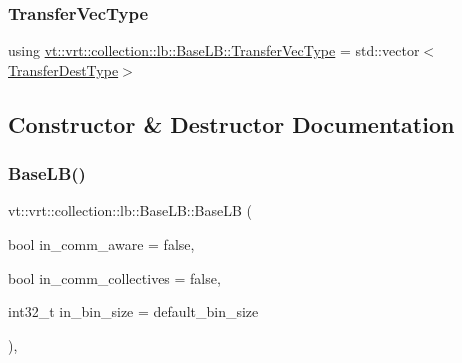 \mbox{\label{structvt_1_1vrt_1_1collection_1_1lb_1_1_base_l_b_a329e8179ec41a1bd4924c79fe23a79af}} 
\subsubsection{\texorpdfstring{Transfer\+Vec\+Type}{TransferVecType}}
{\footnotesize\ttfamily using \hyperlink{structvt_1_1vrt_1_1collection_1_1lb_1_1_base_l_b_a329e8179ec41a1bd4924c79fe23a79af}{vt\+::vrt\+::collection\+::lb\+::\+Base\+L\+B\+::\+Transfer\+Vec\+Type} =  std\+::vector$<$\hyperlink{structvt_1_1vrt_1_1collection_1_1lb_1_1_base_l_b_add886785f64ea725005f1263fd1393be}{Transfer\+Dest\+Type}$>$}



\subsection{Constructor \& Destructor Documentation}
\mbox{\label{structvt_1_1vrt_1_1collection_1_1lb_1_1_base_l_b_addef25b03975034a0936c515a2942d43}} 
\subsubsection{\texorpdfstring{Base\+L\+B()}{BaseLB()}\hspace{0.1cm}{\footnotesize\ttfamily [1/3]}}
{\footnotesize\ttfamily vt\+::vrt\+::collection\+::lb\+::\+Base\+L\+B\+::\+Base\+LB (\begin{DoxyParamCaption}\item[{bool}]{in\+\_\+comm\+\_\+aware = {\ttfamily false},  }\item[{bool}]{in\+\_\+comm\+\_\+collectives = {\ttfamily false},  }\item[{int32\+\_\+t}]{in\+\_\+bin\+\_\+size = {\ttfamily default\+\_\+bin\+\_\+size} }\end{DoxyParamCaption})\hspace{0.3cm}{\ttfamily [inline]}, {\ttfamily [explicit]}}

